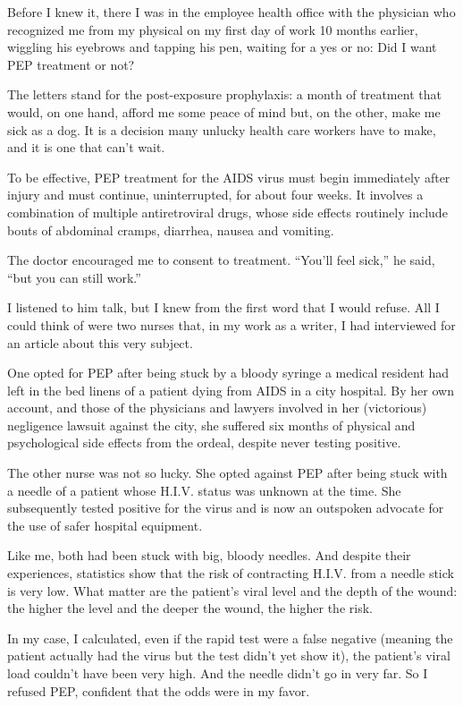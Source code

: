 ﻿\documentclass[12pt]{article}
\begin{document}
Before I knew it, there I was in the employee health office with the physician who recognized me
from my physical on my first day of work 10 months earlier, wiggling his eyebrows and tapping his
pen, waiting for a yes or no: Did I want PEP treatment or not?

The letters stand for the post-exposure prophylaxis: a month of treatment that would, on one hand,
afford me some peace of mind but, on the other, make me sick as a dog. It is a decision many unlucky
health care workers have to make, and it is one that can't wait.

To be effective, PEP treatment for the AIDS virus must begin immediately after injury and must
continue, uninterrupted, for about four weeks. It involves a combination of multiple antiretroviral
drugs, whose side effects routinely include bouts of abdominal cramps, diarrhea, nausea and
vomiting.

The doctor encouraged me to consent to treatment. ``You'll feel sick,'' he said, ``but you can still
work.''

I listened to him talk, but I knew from the first word that I would refuse. All I could think of
were two nurses that, in my work as a writer, I had interviewed for an article about this very
subject.

One opted for PEP after being stuck by a bloody syringe a medical resident had left in the bed
linens of a patient dying from AIDS in a city hospital. By her own account, and those of the
physicians and lawyers involved in her (victorious) negligence lawsuit against the city, she
suffered six months of physical and psychological side effects from the ordeal, despite never
testing positive.

The other nurse was not so lucky. She opted against PEP after being stuck with a needle of a patient
whose H.I.V. status was unknown at the time. She subsequently tested positive for the virus and is
now an outspoken advocate for the use of safer hospital equipment.

Like me, both had been stuck with big, bloody needles. And despite their experiences, statistics
show that the risk of contracting H.I.V. from a needle stick is very low. What matter are the
patient's viral level and the depth of the wound: the higher the level and the deeper the wound, the
higher the risk.

In my case, I calculated, even if the rapid test were a false negative (meaning the patient actually
had the virus but the test didn't yet show it), the patient's viral load couldn't have been very
high. And the needle didn't go in very far. So I refused PEP, confident that the odds were in my
favor.
\end{document}
